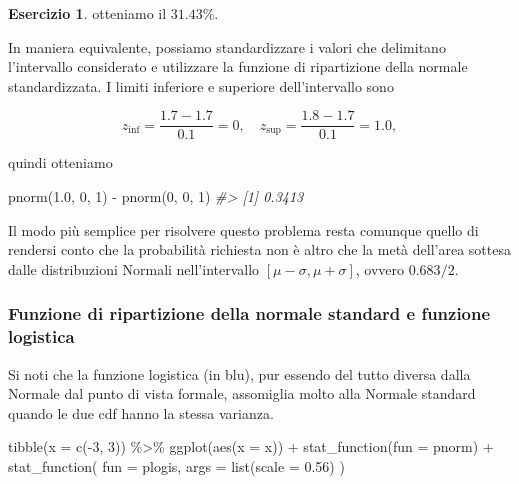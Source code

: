 \documentclass[
  11pt,
]{krantz}
\makeatletter
\newenvironment{Shaded}{\begin{snugshade}}{\end{snugshade}}
\newcommand{\AttributeTok}[1]{\textcolor[rgb]{0.61,0.61,0.61}{#1}}
\newcommand{\CommentTok}[1]{\textcolor[rgb]{0.37,0.37,0.37}{\textit{#1}}}
\newcommand{\DecValTok}[1]{\textcolor[rgb]{0.06,0.06,0.06}{#1}}
\newcommand{\FloatTok}[1]{\textcolor[rgb]{0.06,0.06,0.06}{#1}}
\newcommand{\FunctionTok}[1]{\textcolor[rgb]{0,0,0}{#1}}
\newcommand{\NormalTok}[1]{#1}
\newcommand{\SpecialCharTok}[1]{\textcolor[rgb]{0,0,0}{#1}}
\newenvironment{kframe}{%
\medskip{}
\setlength{\fboxsep}{.8em}
 \def\at@end@of@kframe{}%
 \ifinner\ifhmode%
  \def\at@end@of@kframe{\end{minipage}}%
  \begin{minipage}{\columnwidth}%
 \fi\fi%
 \def\FrameCommand##1{\hskip\@totalleftmargin \hskip-\fboxsep
 \colorbox{shadecolor}{##1}\hskip-\fboxsep
     \hskip-\linewidth \hskip-\@totalleftmargin \hskip\columnwidth}%
 \MakeFramed {\advance\hsize-\width
   \@totalleftmargin\z@ \linewidth\hsize
   \@setminipage}}%
 {\par\unskip\endMakeFramed%
 \at@end@of@kframe}
\renewenvironment{Shaded}{\begin{kframe}}{\end{kframe}}
\theoremstyle{definition}
\theoremstyle{definition}
\theoremstyle{definition}
\newtheorem{exercise}{Esercizio}[chapter]
\theoremstyle{definition}
\theoremstyle{remark}
\makeatother
\begin{document}
\begin{exercise}
otteniamo il \(31.43\%\).

In maniera equivalente, possiamo standardizzare i valori che delimitano l'intervallo considerato e utilizzare la funzione di ripartizione della normale standardizzata. I limiti inferiore e superiore dell'intervallo sono

\[
z_{\text{inf}} = \frac{1.7 - 1.7}{0.1} = 0, \quad z_{\text{sup}} = \frac{1.8 - 1.7}{0.1} = 1.0,
\]

quindi otteniamo

\begin{Shaded}
\begin{Highlighting}[]
\FunctionTok{pnorm}\NormalTok{(}\FloatTok{1.0}\NormalTok{, }\DecValTok{0}\NormalTok{, }\DecValTok{1}\NormalTok{) }\SpecialCharTok{{-}} \FunctionTok{pnorm}\NormalTok{(}\DecValTok{0}\NormalTok{, }\DecValTok{0}\NormalTok{, }\DecValTok{1}\NormalTok{)}
\CommentTok{\#\textgreater{} [1] 0.3413}
\end{Highlighting}
\end{Shaded}

Il modo più semplice per risolvere questo problema resta comunque quello di rendersi conto che la probabilità richiesta non è altro che la metà dell'area sottesa dalle distribuzioni Normali nell'intervallo \([\mu - \sigma, \mu + \sigma]\), ovvero \(0.683/2\).
\end{exercise}

\hypertarget{funzione-di-ripartizione-della-normale-standard-e-funzione-logistica}{%
\subsubsection{Funzione di ripartizione della normale standard e funzione logistica}\label{funzione-di-ripartizione-della-normale-standard-e-funzione-logistica}}

Si noti che la funzione logistica (in blu), pur essendo del tutto diversa dalla Normale dal punto di vista formale, assomiglia molto alla Normale standard quando le due cdf hanno la stessa varianza.

\begin{Shaded}
\begin{Highlighting}[]
\FunctionTok{tibble}\NormalTok{(}\AttributeTok{x =} \FunctionTok{c}\NormalTok{(}\SpecialCharTok{{-}}\DecValTok{3}\NormalTok{, }\DecValTok{3}\NormalTok{)) }\SpecialCharTok{\%\textgreater{}\%}
  \FunctionTok{ggplot}\NormalTok{(}\FunctionTok{aes}\NormalTok{(}\AttributeTok{x =}\NormalTok{ x)) }\SpecialCharTok{+}
  \FunctionTok{stat\_function}\NormalTok{(}\AttributeTok{fun =}\NormalTok{ pnorm) }\SpecialCharTok{+}
  \FunctionTok{stat\_function}\NormalTok{(}
    \AttributeTok{fun =}\NormalTok{ plogis,}
    \AttributeTok{args =} \FunctionTok{list}\NormalTok{(}\AttributeTok{scale =} \FloatTok{0.56}\NormalTok{)}
\NormalTok{  )}
\end{Highlighting}
\end{Shaded}
\end{document}
